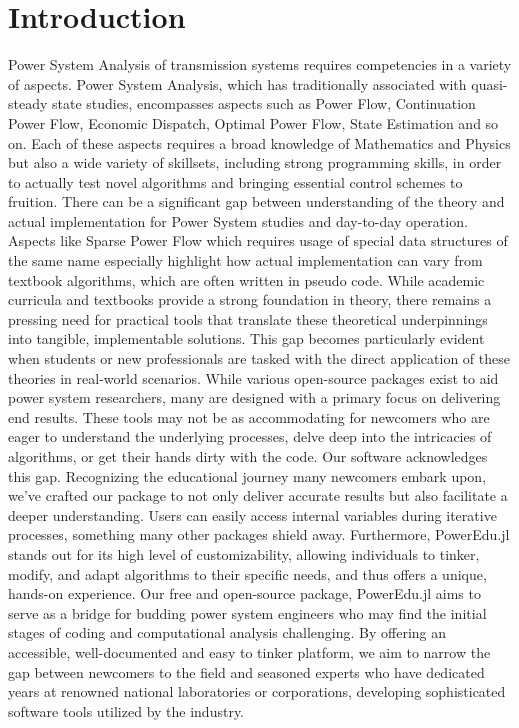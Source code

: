 \documentclass[varwidth]{standalone}
\providecommand{\packageName}[1]{PowerEdu.jl}
\begin{document}
\section{Introduction}
Power System Analysis of transmission systems requires competencies in
a variety of aspects. Power System Analysis, which has traditionally associated with quasi-steady
state studies, encompasses aspects such as Power Flow,
Continuation Power Flow, Economic Dispatch, Optimal Power Flow,
State Estimation and so on. Each of these aspects requires a broad knowledge of
Mathematics and Physics but also a wide variety of skillsets, including
strong programming skills, in order to actually test novel algorithms
and bringing essential control schemes to fruition. There can be a significant
gap between understanding of the theory and actual implementation for Power
System studies and day-to-day operation. Aspects like Sparse Power Flow
which requires usage of special data structures of the same name especially highlight
how actual implementation can vary from textbook algorithms, which are often
written in pseudo code. While academic curricula and textbooks provide a strong
foundation in theory, there remains a pressing need for practical tools that
translate these theoretical underpinnings into tangible, implementable solutions.
This gap becomes particularly evident when students or new professionals are
tasked with the direct application of these theories in real-world scenarios.
While various open-source packages exist to aid power system researchers, many are designed with a primary focus on delivering end results. These tools may not be as accommodating for newcomers who are eager to understand the underlying processes, delve deep into the intricacies of algorithms, or get their hands dirty with the code. Our software acknowledges this gap. Recognizing the educational journey many newcomers embark upon, we've crafted our package to not only deliver accurate results but also facilitate a deeper understanding. Users can easily access internal variables during iterative processes, something many other packages shield away. Furthermore, \packageName{} stands out for its high level of customizability, allowing individuals to tinker, modify, and adapt algorithms to their specific needs, and thus offers a unique, hands-on experience.
Our free and open-source package, \packageName{} aims to serve as a
bridge for budding power system engineers who
may find the initial stages of coding and computational analysis challenging.
By offering an accessible, well-documented and easy to tinker platform, we
aim to narrow the gap between newcomers to the field and seasoned experts
who have dedicated years at renowned national laboratories or corporations,
developing sophisticated software tools utilized
by the industry.
\end{document}
